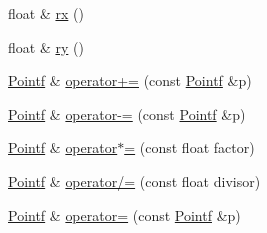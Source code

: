 \begin{DoxyCompactItemize}
float \& \hyperlink{classprism_1_1_pointf_aa96fe413b5dae253548041b227474f30}{rx} ()
\item 
float \& \hyperlink{classprism_1_1_pointf_ad9304ae9fff88025bdca1ad712bc735b}{ry} ()
\item 
\hyperlink{classprism_1_1_pointf}{Pointf} \& \hyperlink{classprism_1_1_pointf_a813ec213136505814dcc79c03ab1b302}{operator+=} (const \hyperlink{classprism_1_1_pointf}{Pointf} \&p)
\item 
\hyperlink{classprism_1_1_pointf}{Pointf} \& \hyperlink{classprism_1_1_pointf_a76cdb0d88900298b7512c4410739299f}{operator-\/=} (const \hyperlink{classprism_1_1_pointf}{Pointf} \&p)
\item 
\hyperlink{classprism_1_1_pointf}{Pointf} \& \hyperlink{classprism_1_1_pointf_ad863628be1d6e41f1e269a0554aee95f}{operator$\ast$=} (const float factor)
\item 
\hyperlink{classprism_1_1_pointf}{Pointf} \& \hyperlink{classprism_1_1_pointf_ade115134cc1e7c16485f1fa61cae2a9c}{operator/=} (const float divisor)
\item 
\hyperlink{classprism_1_1_pointf}{Pointf} \& \hyperlink{classprism_1_1_pointf_a86a68b9f012a2ef66e6151dc30e080f2}{operator=} (const \hyperlink{classprism_1_1_pointf}{Pointf} \&p)
\end{DoxyCompactItemize}
